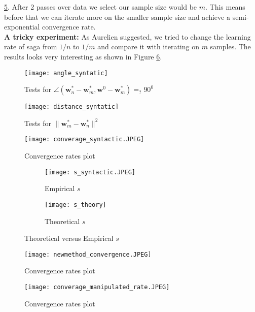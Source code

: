 \documentclass[11pt, a4paper, reqno, twoside]{scrartcl}
\theoremstyle{style}
\newcommand{\wv}{\bm{w}}
\newcommand{\0}{\mathbf{0}} %
\begin{document}
\ref{fig:convergence_newmethod}. After 2 passes over data we select our sample
size would be $m$. This means before that we can iterate more on the smaller
sample size and achieve a semi-exponential convergence rate.
\\
\textbf{A tricky experiment:} As Aurelien suggested, we tried to change the
learning rate of saga from $1/n$ to $1/m$ and compare it with iterating on $m$
samples. The results looks very interesting as shown in Figure
\ref{fig:convergence_manipulated}. 
  \begin{figure}
    \centering
        \texttt{[image: angle\_syntatic]}
    \caption{Tests for $\angle(\wv_n^* - \wv_m^*,\wv^0- \wv_m^*) =_{?}
    90^0$}\label{fig:angles}
 \end{figure} 

\begin{figure}
    \centering
        \texttt{[image: distance\_syntatic]}
    \caption{Tests for $\| \wv_m^* - \wv_n^* \|^2$}\label{fig:xmxn}
\end{figure} 

\begin{figure}
    \centering
        \texttt{[image: converage\_syntactic.JPEG]}
    \caption{Convergence rates plot}\label{fig:convergence_syn}
 \end{figure} 
 
 \begin{figure}
 \begin{subfigure}{.5\textwidth}
 \centering
        \texttt{[image: s\_syntactic.JPEG]}
         \caption{Empirical $s$ }
 \end{subfigure}
 \begin{subfigure}{.5\textwidth}
 \centering
        \texttt{[image: s\_theory]}
         \caption{Theoretical $s$}
 \end{subfigure}   
 \caption{Theoretical versus Empirical $s$ }\label{fig:theory_vs_practice}
 \end{figure} 
 
 \begin{figure}
    \centering
        \texttt{[image: newmethod\_convergence.JPEG]}
    \caption{Convergence rates plot}\label{fig:convergence_newmethod}
 \end{figure}
 \begin{figure}
    \centering
        \texttt{[image: converage\_manipulated\_rate.JPEG]}
    \caption{Convergence rates plot}\label{fig:convergence_manipulated}
 \end{figure}
 
\end{document}
